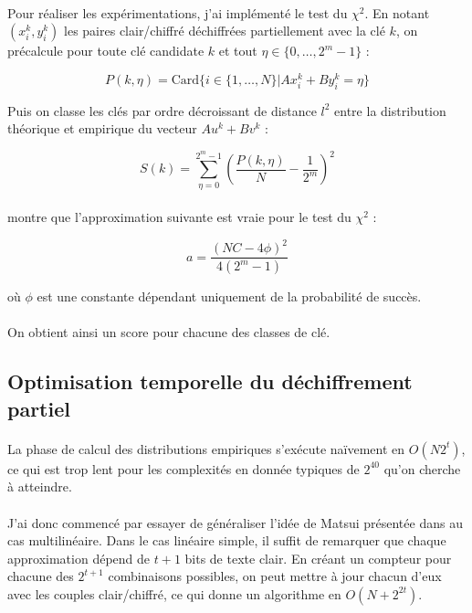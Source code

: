 \documentclass{scrartcl}
\begin{document}
\paragraph*{}
Pour réaliser les expérimentations, j'ai implémenté le test du $\chi^2$. En notant $(x_i^k,y_i^k)$ les paires clair/chiffré déchiffrées partiellement avec la clé $k$,
on précalcule pour toute clé candidate $k$ et tout $\eta \in\{0,\ldots,2^m-1\}$ :

$$P(k,\eta)=\text{Card}\{i\in\{1,\ldots,N\} | Ax_i^k+By_i^k=\eta\}$$

Puis on classe les clés par ordre décroissant de distance $l^2$ entre la distribution théorique et empirique du vecteur $Au^k+Bv^k$ :

$$S(k)=\sum_{\eta=0}^{2^m-1} \left(\frac{P(k,\eta)}{N}-\frac{1}{2^m}\right)^2$$

\paragraph*{}
\cite{TheseHermelin} montre que l'approximation suivante est vraie pour le test du $\chi^2$ :

$$a=\frac{(NC-4\phi)^2}{4(2^m-1)}$$

où $\phi$ est une constante dépendant uniquement de la probabilité de succès.

\paragraph*{}
On obtient ainsi un score pour chacune des classes de clé.

\subsection{Optimisation temporelle du déchiffrement partiel}

\paragraph*{}
La phase de calcul des distributions empiriques s'exécute naïvement en $O(N2^t)$, ce qui est trop lent
pour les complexités en donnée typiques de $2^{40}$ qu'on cherche à atteindre.

\paragraph*{}
J'ai donc commencé par essayer de généraliser l'idée de Matsui présentée dans \cite{FirstCrypt} au cas multilinéaire.
Dans le cas linéaire simple, il suffit de remarquer que chaque approximation dépend de $t+1$ bits de texte clair. En
créant un compteur pour chacune des $2^{t+1}$ combinaisons possibles, on peut mettre à jour chacun d'eux avec les couples
clair/chiffré, ce qui donne un algorithme en $O(N+2^{2t})$.
\end{document}
